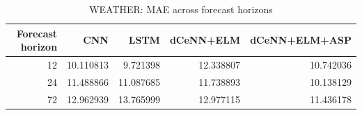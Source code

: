 \begin{table}
\caption{WEATHER: MAE across forecast horizons}
\begin{tabular}{rrrrr}
\toprule
Forecast horizon & CNN & LSTM & dCeNN+ELM & dCeNN+ELM+ASP \\
\midrule
12 & 10.110813 & 9.721398 & 12.338807 & 10.742036 \\
24 & 11.488866 & 11.087685 & 11.738893 & 10.138129 \\
72 & 12.962939 & 13.765999 & 12.977115 & 11.436178 \\
\bottomrule
\end{tabular}
\end{table}
